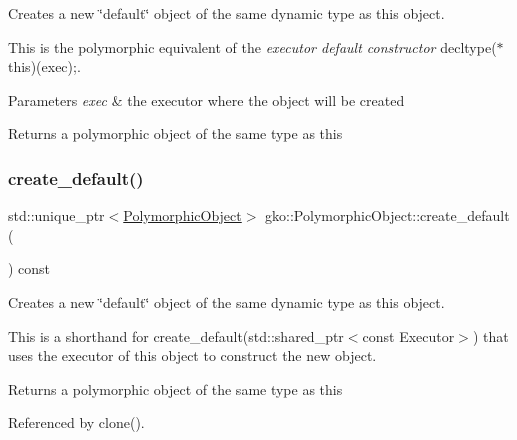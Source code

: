 Creates a new \char`\"{}default\char`\"{} object of the same dynamic type as this object. 

This is the polymorphic equivalent of the {\itshape executor default constructor} {\ttfamily decltype($\ast$this)(exec);}.


\begin{DoxyParams}{Parameters}
{\em exec} & the executor where the object will be created\\
\hline
\end{DoxyParams}
\begin{DoxyReturn}{Returns}
a polymorphic object of the same type as this 
\end{DoxyReturn}
\mbox{\label{classgko_1_1PolymorphicObject_a4f39c32375e3887fd4d7a9f02af42ca7}} 
\subsubsection{\texorpdfstring{create\+\_\+default()}{create\_default()}\hspace{0.1cm}{\footnotesize\ttfamily [2/2]}}
{\footnotesize\ttfamily std\+::unique\+\_\+ptr$<$\hyperlink{classgko_1_1PolymorphicObject}{Polymorphic\+Object}$>$ gko\+::\+Polymorphic\+Object\+::create\+\_\+default (\begin{DoxyParamCaption}{ }\end{DoxyParamCaption}) const}



Creates a new \char`\"{}default\char`\"{} object of the same dynamic type as this object. 

This is a shorthand for create\+\_\+default(std\+::shared\+\_\+ptr$<$const Executor$>$) that uses the executor of this object to construct the new object.

\begin{DoxyReturn}{Returns}
a polymorphic object of the same type as this 
\end{DoxyReturn}


Referenced by clone().

\mbox{\label{classgko_1_1PolymorphicObject_ab40586bff071b7f11c2cf6b5cbf598eb}} 
